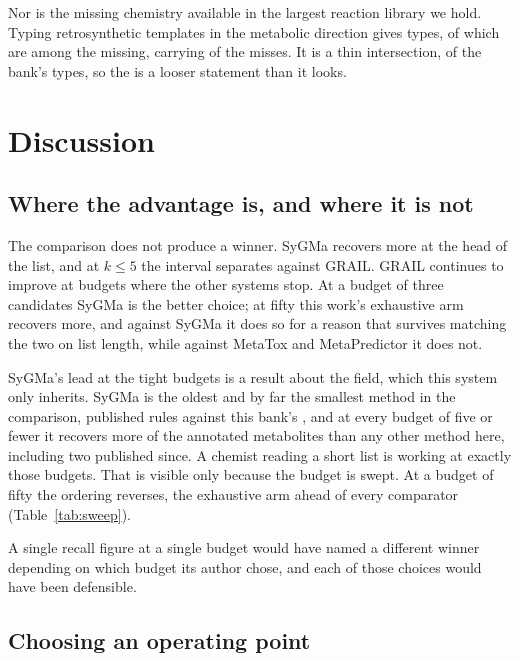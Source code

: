 Nor is the missing chemistry available in the largest reaction library we hold. Typing
\numUsptoTemplates{} retrosynthetic templates \citep{Maziarz_2025, Tanovic_2026} in the
metabolic direction gives \numUsptoTypes{}
types, of which \numUsptoHit{} are among the \numCensusTypes{} missing, carrying \numUsptoMass{}
of the \numCeilingNovel{} misses. It is a thin intersection, \numUsptoSanity{} of the bank's \numBankTypes{} types, so the \numUsptoHit{} is a looser statement than it looks.

\section{Discussion}
\label{sec:discussion}

\subsection{Where the advantage is, and where it is not}

The comparison does not produce a winner. SyGMa recovers more at the head of the list, and at
$k \le 5$ the interval separates against GRAIL. GRAIL continues to improve at budgets where the
other systems stop. At a budget of three candidates SyGMa is the better choice; at fifty this
work's exhaustive arm recovers more, and against SyGMa it does so for a reason that survives
matching the two on list length, while against MetaTox and MetaPredictor it does not.

SyGMa's lead at the tight budgets is a result about the field, which this system only inherits. SyGMa is the
oldest and by far the smallest method in the comparison, \numSygmaRules{} published rules against
this bank's \numBankRules{}, and at every budget of five or fewer it recovers more of the
annotated metabolites than any other method here, including two published since. A chemist
reading a short list is working at exactly those budgets. That is visible only because the budget is swept.
At a budget of fifty the ordering reverses, the exhaustive arm ahead of every comparator (Table~\ref{tab:sweep}).

A single recall figure at a single budget would have named a different winner depending on which
budget its author chose, and each of those choices would have been defensible.

\subsection{Choosing an operating point}
\label{sec:offers}

